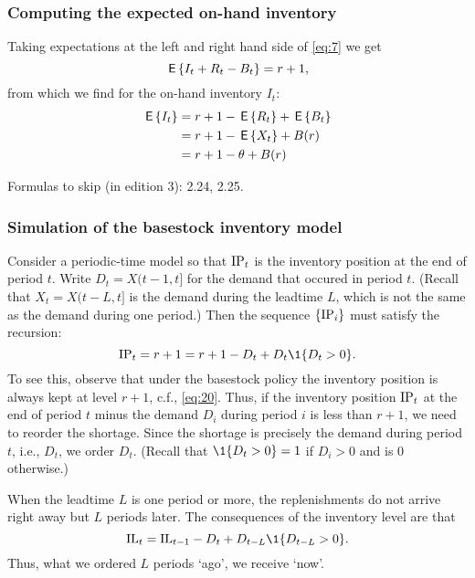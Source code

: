 \subsubsection{Computing the expected on-hand inventory}

Taking expectations at the left and right hand side of \eqref{eq:7} we get
\begin{equation*}
  \,\mathsf{E}\left\{I_t + R_t - B_t\right\} = r+1,
\end{equation*}
from which we find for the on-hand inventory $I_t$: 
\begin{equation}
  \label{eq:6}
  \begin{split}
  \,\mathsf{E}\left\{I_t\right\}
  &= r+1 - \,\mathsf{E}\left\{R_t\right\} + \,\mathsf{E}\left\{B_t\right\}  \\
  & = r + 1 - \,\mathsf{E}\left\{X_t\right\} + B(r) \\
  & = r + 1 - \theta + B(r) \\
  \end{split}
\end{equation}

Formulas to skip (in edition 3): 2.24, 2.25. 


\subsubsection{Simulation of the basestock inventory model}
\label{sec:simul-basest-invent}

Consider a periodic-time model so that $\textrm{IP}_t$ is the inventory position at the end of period $t$. Write $D_t = X(t-1, t]$ for the demand that occured in period $t$. (Recall that $X_t = X(t-L, t]$ is the demand during the leadtime $L$, which is not the same as the demand during one period.)
 Then the sequence $\{\textrm{IP}_i\}$ must satisfy the recursion:
\begin{equation}
  \label{eq:15}
  \IP_t = r+1 = r+1 - D_t + D_t \1{D_t>0}.
\end{equation}
To see this, observe that under the basestock policy the inventory
position is always kept at level $r+1$, c.f., \eqref{eq:20}. Thus, if
the inventory position $\textrm{IP}_t$ at the end of period $t$ minus the demand
$D_i$ during period $i$ is less than $r+1$, we need to reorder the
shortage. Since the shortage is precisely the demand during period
$t$, i.e., $D_t$, we order $D_t$. (Recall that $\1{D_t>0} = 1$ if
$D_i>0$ and is $0$ otherwise.)

When the leadtime $L$ is one period or more, the replenishments do not arrive right away but $L$ periods later. The consequences of the inventory level are that
\begin{equation}
  \label{eq:21}
  \IL_t = \IL_{t-1} - D_t + D_{t-L}\1{D_{t-L}>0}.
\end{equation}
Thus, what we ordered $L$ periods `ago', we receive `now'.

